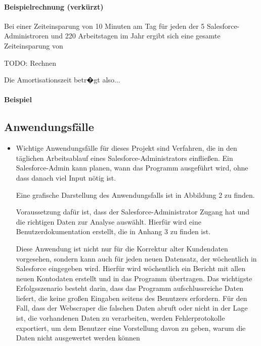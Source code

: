 \paragraph{Beispielrechnung (verk\"urzt)}
Bei einer Zeiteinsparung von 10 Minuten am Tag für jeden der 5 Salesforce-Administroren und 220 Arbeitstagen im Jahr ergibt sich eine gesamte Zeiteinsparung von 

TODO: Rechnen

Die Amortisationszeit betr�gt also...


\paragraph{Beispiel}


\subsection{Anwendungsf\"alle}
\label{sec:Anwendungsfaelle}
\begin{itemize}
\item Wichtige Anwendungsf\"alle f\"ur dieses Projekt sind Verfahren, die in den t\"aglichen Arbeitsablauf eines Salesforce-Administrators einflie{\ss}en. Ein Salesforce-Admin kann planen, wann das Programm ausgef\"uhrt wird, ohne dass danach viel Input n\"otig ist. 

Eine grafische Darstellung des Anwendungsfalls ist in Abbildung 2 zu finden. 

Voraussetzung daf\"ur ist, dass der Salesforce-Administrator Zugang hat und die richtigen Daten zur Analyse ausw\"ahlt. Hierf\"ur wird eine Benutzerdokumentation erstellt, die in Anhang 3 zu finden ist.

Diese Anwendung ist nicht nur f\"ur die Korrektur alter Kundendaten vorgesehen, sondern kann auch f\"ur jeden neuen Datensatz, der w\"ochentlich in Salesforce eingegeben wird. Hierf\"ur wird w\"ochentlich ein Bericht mit allen neuen Kontodaten erstellt und in das Programm \"ubertragen.
Das wichtigste Erfolgsszenario besteht darin, dass das Programm aufschlussreiche Daten liefert, die keine gro{\ss}en Eingaben seitens des Benutzers erfordern.
F\"ur den Fall, dass der Webscraper die falschen Daten abruft oder nicht in der Lage ist, die vorhandenen Daten zu verarbeiten, werden Fehlerprotokolle exportiert, um dem Benutzer eine Vorstellung davon zu geben, warum die Daten nicht ausgewertet werden k\"onnen
\end{itemize}


